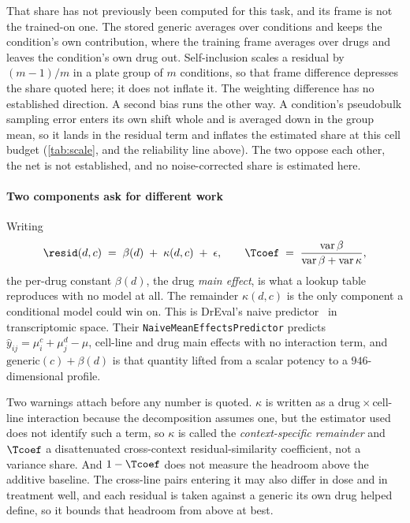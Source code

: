 

That share has not previously been computed for this task, and its frame is not
the trained-on one. The stored generic averages over conditions and keeps the
condition's own contribution, where the training frame averages over drugs and
leaves the condition's own drug out. Self-inclusion scales a residual by
$(m-1)/m$ in a plate group of $m$ conditions, so that frame difference depresses
the share quoted here; it does not inflate it. The weighting difference has no
established direction. A second bias runs the other way. A condition's pseudobulk
sampling error enters its own shift whole and is averaged down in the group mean,
so it lands in the residual term and inflates the estimated share at this cell
budget (\cref{tab:scale}, and the reliability line above). The two oppose each
other, the net is not established, and no noise-corrected share is estimated
here.

\paragraph{Two components ask for different work} Writing
\begin{equation}
 \resid(d,c) \;=\; \beta(d) \;+\; \kappa(d,c) \;+\; \epsilon,
 \qquad
 \Tcoef \;=\; \frac{\operatorname{var}\beta}{\operatorname{var}\beta + \operatorname{var}\kappa},
\end{equation}
the per-drug constant $\beta(d)$, the drug \emph{main effect}, is what a lookup
table reproduces with no model at all. The remainder $\kappa(d,c)$ is the only component a
conditional model could win on. This is DrEval's naive predictor~\cite{dreval} in
transcriptomic space. Their \texttt{NaiveMeanEffectsPredictor} predicts
$\hat{y}_{ij} = \mu^c_i + \mu^d_j - \mu$, cell-line and drug main effects with no
interaction term, and $\textrm{generic}(c) + \beta(d)$ is that quantity lifted
from a scalar potency to a $946$-dimensional profile.

Two warnings attach before any number is quoted. $\kappa$ is written as a
drug\,$\times$\,cell-line interaction because the decomposition assumes one, but
the estimator used does not identify such a term, so $\kappa$ is called the
\emph{context-specific remainder} and $\Tcoef$ a disattenuated cross-context
residual-similarity coefficient, not a variance share. And $1 - \Tcoef$ does not
measure the headroom above the additive baseline. The cross-line pairs entering
it may also differ in dose and in treatment well, and each residual is taken
against a generic its own drug helped define, so it bounds that headroom from
above at best.

